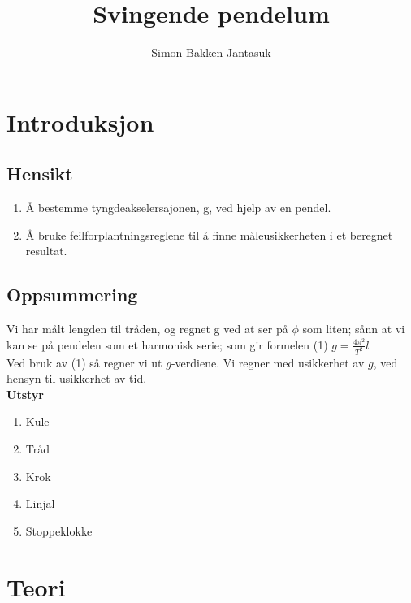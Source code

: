 \documentclass[a4paper]{article}
\title{Svingende pendelum}
\author{Simon Bakken-Jantasuk}
\begin{document}
\maketitle

\tableofcontents

\listoftables

\pagebreak

\section{Introduksjon} %
\label{sec:introduksjon}
\subsection{Hensikt} %
\label{sub:hensikt}
\begin{flushleft}
	\begin{enumerate}
		\item Å bestemme tyngdeakselersajonen, g, ved hjelp av en pendel. \\
		\item Å bruke feilforplantningsreglene til å finne måleusikkerheten i et beregnet resultat.\\
	\end{enumerate}
\end{flushleft}
\subsection{Oppsummering} %
\label{sub:oppsummering}
Vi har målt lengden til tråden, og regnet g ved at ser på $\phi$ som liten; sånn at vi kan se på pendelen som et harmonisk serie; som gir formelen (1) $g = \frac{4\pi^2}{T^2} l$ \\
Ved bruk av (1) så regner vi ut $g$-verdiene. Vi regner med usikkerhet av $g$, ved hensyn til usikkerhet av tid. \\



\textbf{Utstyr} 
\begin{enumerate}
	\item Kule
	\item Tråd
	\item Krok
	\item Linjal
	\item Stoppeklokke
\end{enumerate}

\section{Teori} %
\label{sec:teori}
\end{document}
